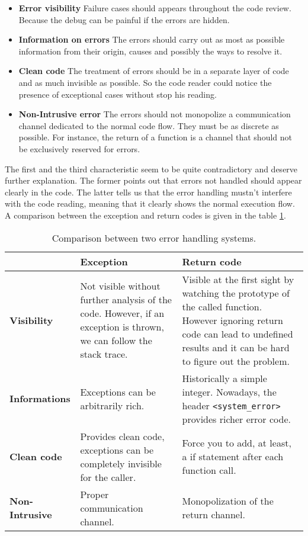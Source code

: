 \documentclass[a4paper,10pt]{article}
\newcommand{\cpp}[1]{\lstinline{#1}}
\begin{document}
\begin{itemize}
 \item \textbf{Error visibility} Failure cases should appears throughout the code review. Because the debug can be painful if the errors are hidden.
 \item \textbf{Information on errors} The errors should carry out as most as possible information from their origin, causes and possibly the ways to resolve it.
 \item \textbf{Clean code} The treatment of errors should be in a separate layer of code and as much invisible as possible. So the code reader could notice the presence of exceptional cases without stop his reading.
 \item \textbf{Non-Intrusive error} The errors should not monopolize a communication channel dedicated to the normal code flow. They must be as discrete as possible. For instance, the return of a function is a channel that should not be exclusively reserved for errors.
\end{itemize}

The first and the third characteristic seem to be quite contradictory and deserve further explanation. The former points out that errors not handled should appear clearly in the code. The latter tells us that the error handling mustn't interfere with the code reading, meaning that it clearly shows the normal execution flow. A comparison between the exception and return codes is given in the table \ref{comp-handling-error}.


\begin{table}
\bgroup
\def\arraystretch{1.5}
\begin{tabular}{|l|>{\raggedright\arraybackslash}p{5cm}|>{\raggedright\arraybackslash}p{5cm}|}
\hline
                    & \textbf{Exception} & \textbf{Return code} \\
\hline
\textbf{Visibility} & Not visible without further analysis of the code. However, if an exception is thrown, we can follow the stack trace. & Visible at the first sight by watching the prototype of the called function. However ignoring return code can lead to undefined results and it can be hard to figure out the problem. \\
\hline
\textbf{Informations} & Exceptions can be arbitrarily rich. & Historically a simple integer. Nowadays, the header \cpp{<system_error>} provides richer error code. \\
\hline
\textbf{Clean code} & Provides clean code, exceptions can be completely invisible for the caller. & Force you to add, at least, a if statement after each function call. \\
\hline
\textbf{Non-Intrusive} & Proper communication channel. & Monopolization of the return channel. \\
\hline
\end{tabular}
\egroup
\caption{Comparison between two error handling systems.}
\label{comp-handling-error}
\end{table}
\end{document}
